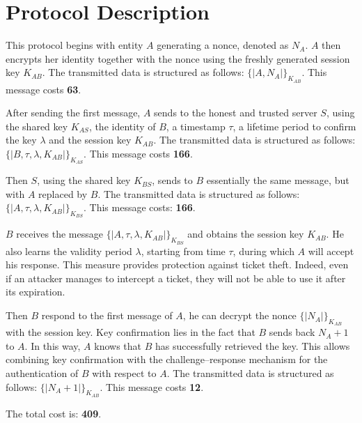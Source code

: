 \section{Protocol Description}



This protocol begins with entity $A$ generating a nonce, denoted as $N_A$. $A$ then encrypts her identity together
with the nonce using the freshly generated session key $K_{AB}$. The transmitted data is structured as follows:
$\{|A,N_A|\}_{K_{AB}}$. This message costs \textbf{63}.

\vspace{1cm}

After sending the first message, $A$ sends to the honest and trusted server $S$, using the shared key $K_{AS}$,
the identity of $B$, a timestamp $\tau$, a lifetime period to confirm the key $\lambda$ and the session key $K_{AB}$.
The transmitted data is structured as follows: $\{|B, \tau, \lambda, K_{AB}|\}_{K_{AS}}$. This message costs \textbf{166}.

\vspace{1cm}

Then $S$, using the shared key $K_{BS}$, sends to $B$ essentially the same message, but with $A$ replaced by $B$.
The transmitted data is structured as follows: $\{|A, \tau, \lambda, K_{AB}|\}_{K_{BS}}$. This message costs: \textbf{166}.

\vspace{1cm}

$B$ receives the message $\{|A, \tau, \lambda, K_{AB}|\}_{K_{BS}}$ and obtains the session key $K_{AB}$.
He also learns the validity period $\lambda$, starting from time $\tau$, during which $A$ will accept his response.
This measure provides protection against ticket theft. Indeed, even if an attacker manages to intercept a ticket,
they will not be able to use it after its expiration.

Then $B$ respond to the first message of $A$, he can decrypt the nonce $\{|N_A|\}_{K_{AB}}$ with the session key.
Key confirmation lies in the fact that $B$ sends back $N_A + 1$ to $A$. In this way, $A$ knows that $B$ has successfully
retrieved the key. This allows combining key confirmation with the challenge–response mechanism for the authentication
of $B$ with respect to $A$. The transmitted data is structured as follows: $\{| N_A + 1|\}_{K_{AB}}$. This message costs \textbf{12}.



\vspace{1cm}

The total cost is: \textbf{409}.